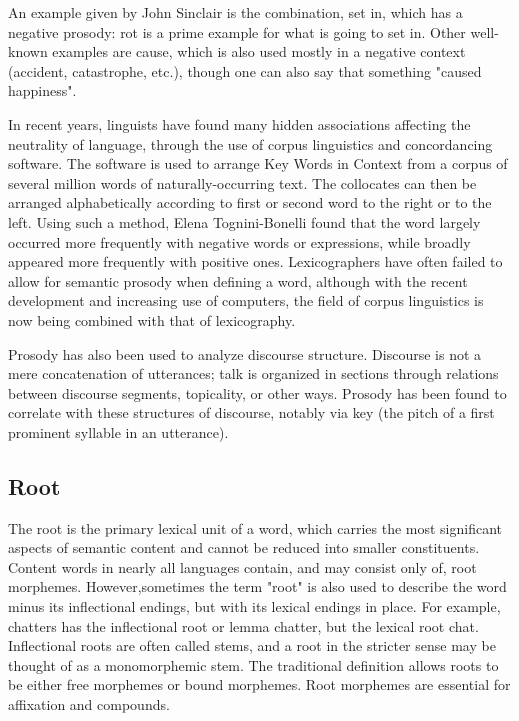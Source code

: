 An example given by John Sinclair is the combination, set in, which has a negative prosody: rot is a prime example for what is going to set in. Other well-known examples are cause, which is also used mostly in a negative context (accident, catastrophe, etc.), though one can also say that something "caused happiness".

In recent years, linguists have found many hidden associations affecting the neutrality of language, through the use of corpus linguistics and concordancing software. The software is used to arrange Key Words in Context from a corpus of several million words of naturally-occurring text. The collocates can then be arranged alphabetically according to first or second word to the right or to the left. Using such a method, Elena Tognini-Bonelli found that the word largely occurred more frequently with negative words or expressions, while broadly appeared more frequently with positive ones. Lexicographers have often failed to allow for semantic prosody when defining a word, although with the recent development and increasing use of computers, the field of corpus linguistics is now being combined with that of lexicography.

Prosody has also been used to analyze discourse structure. Discourse is not a mere concatenation of utterances; talk is organized in sections through relations between discourse segments, topicality, or other ways. Prosody has been found to correlate with these structures of discourse, notably via key (the pitch of a first prominent syllable in an utterance).

\subsection{Root}
The root is the primary lexical unit of a word, which carries the most significant aspects of semantic content and cannot be reduced into smaller constituents. Content words in nearly all languages contain, and may consist only of, root morphemes. However,sometimes the term "root" is also used to describe the word minus its inflectional endings, but with its lexical endings in place. For example, chatters has the inflectional root or lemma chatter, but the lexical root chat. Inflectional roots are often called stems, and a root in the stricter sense may be thought of as a monomorphemic stem.  The traditional definition allows roots to be either free morphemes or bound morphemes. Root morphemes are essential for affixation and compounds.

